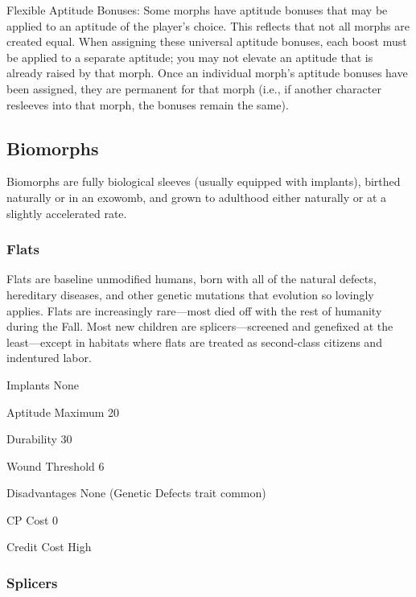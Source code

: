 Flexible Aptitude Bonuses: Some morphs have aptitude bonuses that may be applied to an aptitude of the player’s choice. This reflects that not all morphs are created equal. When assigning these universal aptitude bonuses, each boost must be applied to a separate aptitude; you may not elevate an aptitude that is already raised by that morph. Once an individual morph’s aptitude bonuses have been assigned, they are permanent for that morph (i.e., if another character resleeves into that morph, the bonuses remain the same). 

\subsection{Biomorphs} \label{sec:starting-biomorphs} 

Biomorphs are fully biological sleeves (usually equipped with implants), birthed naturally or in an exowomb, and grown to adulthood either naturally or at a slightly accelerated rate. 

\subsubsection{Flats} \label{sec:starting-flats} 

Flats are baseline unmodified humans, born with all of the natural defects, hereditary diseases, and other genetic mutations that evolution so lovingly applies. Flats are increasingly rare—most died off with the rest of humanity during the Fall. Most new children are splicers—screened and genefixed at the least—except in habitats where flats are treated as second-class citizens and indentured labor. 

\begin{description*} \item[Implants] None \item[Aptitude Maximum] 20 \item[Durability] 30 \item[Wound Threshold] 6 \item[Disadvantages] None (Genetic Defects trait common) \item[CP Cost] 0 \item[Credit Cost] High \end{description*} 

\subsubsection{Splicers} \label{sec:starting-splicers} 


